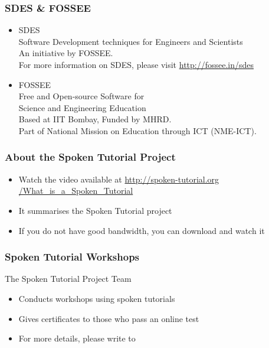 \documentclass[17pt,compress]{beamer}
\begin{document}
\begin{frame}
\frametitle{SDES \& FOSSEE}
\begin{center}
\begin{itemize}
\item \small{SDES}\\
\small{\color{LimeGreen}Software Development techniques for Engineers and Scientists} \\
\scriptsize An initiative by FOSSEE. \\
\vspace{3pt}
\scriptsize For more information on SDES, please visit {\color{blue}\url{http://fossee.in/sdes}}\\
\vspace{12pt}
\item \small{FOSSEE}\\
\small {\color{LimeGreen}Free and Open-source Software for \\Science and Engineering Education} \\
\scriptsize Based at IIT Bombay, Funded by MHRD.\\
\vspace{3pt}
\scriptsize Part of National Mission on Education through ICT (NME-ICT). \\
\end{itemize}
\end{center}
\end{frame}

\begin{frame}
\frametitle{About the Spoken Tutorial Project}
\begin{itemize}
\item Watch the video available at {\color{blue}\url{http://spoken-tutorial.org /What\_is\_a\_Spoken\_Tutorial}} 
\item It summarises the Spoken Tutorial project 
\item If you do not have good bandwidth, you can download and watch it
\end{itemize}
\end{frame}

\begin{frame}
\frametitle{Spoken Tutorial Workshops}The Spoken Tutorial Project Team 
\begin{itemize}
\item Conducts workshops using spoken tutorials 
\item Gives certificates to those who pass an online test 
\item For more details, please write to \\ 
\end{itemize}
\end{frame}
\end{document}

